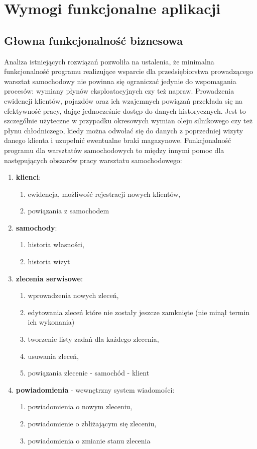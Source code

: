 \chapter{Wymogi funkcjonalne aplikacji}
\label{chapter:app_functional_requirements}

	\section{Głowna funkcjonalność biznesowa}
		Analiza istniejących rozwiązań pozwoliła na ustalenia, że minimalna funkcjonalność programu realizujące wsparcie dla przedsiębiorstwa prowadzącego warsztat samochodowy nie powinna się ograniczać jedynie do wspomagania procesów: wymiany płynów eksploatacyjnych czy też napraw. Prowadzenia ewidencji klientów, pojazdów oraz ich wzajemnych powiązań przekłada się na efektywność pracy, dając jednocześnie dostęp do danych historycznych. Jest to szczególnie użyteczne w przypadku okresowych wymian oleju silnikowego czy też płynu chłodniczego, kiedy można odwołać się do danych z poprzedniej wizyty danego klienta i uzupełnić ewentualne braki magazynowe. Funkcjonalność programu dla warsztatów samochodowych to między innymi pomoc dla następujących obszarów pracy warsztatu samochodowego:
		\begin{enumerate}
			\item \textbf{klienci}:
			\begin{enumerate}
				\item ewidencja, możliwość rejestracji nowych klientów,
				\item powiązania z samochodem
			\end{enumerate}
			\item \textbf{samochody}:
			\begin{enumerate}
				\item historia własności,
				\item historia wizyt
			\end{enumerate}
			\item \textbf{zlecenia serwisowe}:
			\begin{enumerate}
				\item wprowadzenia nowych zleceń,
				\item edytowania zleceń które nie zostały jeszcze zamknięte (nie minął termin ich wykonania)
				\item tworzenie listy zadań dla każdego zlecenia,
				\item usuwania zleceń,
				\item powiązania zlecenie - samochód - klient
			\end{enumerate}
			\item \textbf{powiadomienia} - wewnętrzny system wiadomości:
			\begin{enumerate}
				\item powiadomienia o nowym zleceniu,
				\item powiadomienie o zbliżającym się zleceniu,
				\item powiadomienia o zmianie stanu zlecenia
			\end{enumerate}
		\end{enumerate}
	
